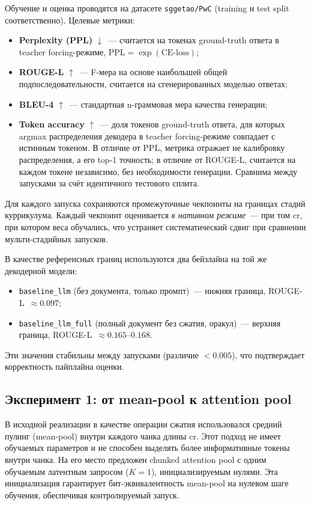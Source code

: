 \documentclass[a4paper,12pt]{extarticle}
\begin{document}
Обучение и оценка проводятся на датасете \texttt{sggetao/PwC} (training и test split соответственно). Целевые метрики:

\begin{itemize}
    \item \textbf{Perplexity (PPL)} $\downarrow$~--- считается на токенах ground-truth ответа в teacher forcing-режиме, $\mathrm{PPL} = \exp(\mathrm{CE\text{-}loss})$;
    \item \textbf{ROUGE-L} $\uparrow$~--- F-мера на основе наибольшей общей подпоследовательности, считается на сгенерированных моделью ответах;
    \item \textbf{BLEU-4} $\uparrow$~--- стандартная n-граммовая мера качества генерации;
    \item \textbf{Token accuracy} $\uparrow$~--- доля токенов ground-truth ответа, для которых argmax распределения декодера в teacher forcing-режиме совпадает с истинным токеном. В отличие от PPL, метрика отражает не калибровку распределения, а его top-1 точность; в отличие от ROUGE-L, считается на каждом токене независимо, без необходимости генерации. Сравнима между запусками за счёт идентичного тестового сплита.
\end{itemize}

Для каждого запуска сохраняются промежуточные чекпоинты на границах стадий куррикулума. Каждый чекпоинт оценивается \textit{в нативном режиме}~--- при том $\text{cr}$, при котором веса обучались, что устраняет систематический сдвиг при сравнении мульти-стадийных запусков.

В качестве референсных границ используются два бейзлайна на той же декодерной модели:
\begin{itemize}
    \item \texttt{baseline\_llm} (без документа, только промпт)~--- нижняя граница, ROUGE-L~$\approx 0.097$;
    \item \texttt{baseline\_llm\_full} (полный документ без сжатия, оракул)~--- верхняя граница, ROUGE-L~$\approx 0.165$--$0.168$.
\end{itemize}
Эти значения стабильны между запусками (различие $< 0.005$), что подтверждает корректность пайплайна оценки.

\subsection{Эксперимент 1: от mean-pool к attention pool}\label{sec:exp-pool}

В исходной реализации в качестве операции сжатия использовался средний пулинг (mean-pool) внутри каждого чанка длины $\text{cr}$. Этот подход не имеет обучаемых параметров и не способен выделять более информативные токены внутри чанка. На его место предложен chunked attention pool с одним обучаемым латентным запросом ($K = 1$), инициализируемым нулями. Эта инициализация гарантирует бит-эквивалентность mean-pool на нулевом шаге обучения, обеспечивая контролируемый запуск.
\end{document}
